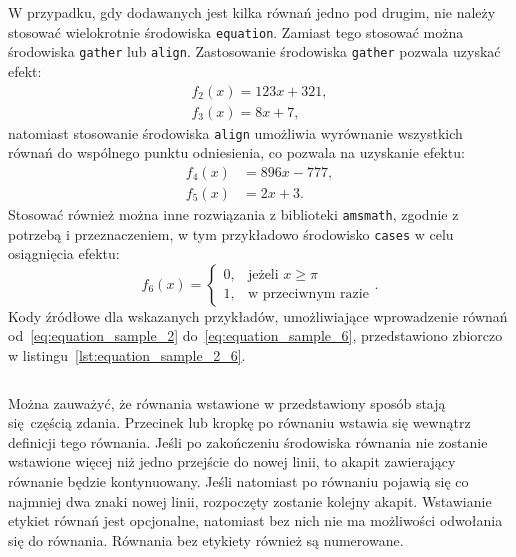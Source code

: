 W przypadku, gdy dodawanych jest kilka równań jedno pod drugim, nie należy stosować wielokrotnie środowiska \texttt{equation}. Zamiast tego stosować można środowiska \texttt{gather} lub \texttt{align}. Zastosowanie środowiska \texttt{gather} pozwala uzyskać efekt:
\begin{gather}
f_{2}(x) = 123 x + 321 \label{eq:equation_sample_2}, \\
f_{3}(x) = 8 x + 7 \label{eq:equation_sample_3},
\end{gather}
natomiast stosowanie środowiska \texttt{align} umożliwia wyrównanie wszystkich równań do wspólnego punktu odniesienia, co pozwala na uzyskanie efektu:
\begin{align}
f_{4}(x) &= 896 x - 777 \label{eq:equation_sample_4}, \\
f_{5}(x) &= 2 x + 3 \label{eq:equation_sample_5}.
\end{align}
Stosować również można inne rozwiązania z biblioteki \texttt{amsmath}, zgodnie z potrzebą i przeznaczeniem, w tym przykładowo środowisko \texttt{cases} w celu osiągnięcia efektu:
\begin{equation}
f_{6}(x) =
\begin{cases}
0, & \text{jeżeli $x \ge \pi$}  \\
1, & \text{w przeciwnym razie}
\end{cases}
\label{eq:equation_sample_6}.
\end{equation}
Kody źródłowe dla wskazanych przykładów, umożliwiające wprowadzenie równań od~\eqref{eq:equation_sample_2} do~\eqref{eq:equation_sample_6}, przedstawiono zbiorczo w listingu~\ref{lst:equation_sample_2_6}.

\begin{listing}[htb]
\inputminted{latex}{skrypty/equations_sample.tex}
\end{listing}

Można zauważyć, że równania wstawione w przedstawiony sposób stają się częścią zdania. Przecinek lub kropkę po równaniu wstawia się wewnątrz definicji tego równania. Jeśli po zakończeniu środowiska równania nie zostanie wstawione więcej niż jedno przejście do nowej linii, to akapit zawierający równanie będzie kontynuowany. Jeśli natomiast po równaniu pojawią się co najmniej dwa znaki nowej linii, rozpoczęty zostanie kolejny akapit. Wstawianie etykiet równań jest opcjonalne, natomiast bez nich nie ma możliwości odwołania się do równania. Równania bez etykiety również są numerowane.

